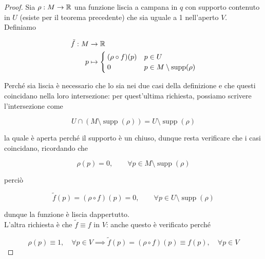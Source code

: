 \begin{proof}
	Sia $ \rho : M \to \mathbb{R} $ una funzione liscia a campana in $ q $ con supporto contenuto in $ U $ (esiste per il teorema precedente) che sia uguale a 1 nell'aperto $ V $.\\
	Definiamo
	
	\begin{align}
		\begin{split}
			\tilde{f} : M &\to \R\\
			p &\mapsto %
			\begin{cases}
				(\rho \circ f)(p) & p \in U\\
				0 & p \in M \setminus \operatorname{supp}(\rho)
			\end{cases}
		\end{split}
	\end{align}

	Perché sia liscia è necessario che lo sia nei due casi della definizione e che questi coincidano nella loro intersezione: per quest'ultima richiesta, possiamo scrivere l'intersezione come
	
	\begin{equation}
		U \cap (M \setminus \operatorname{supp}(\rho)) = U \setminus \operatorname{supp}(\rho)
	\end{equation}

	la quale è aperta perché il supporto è un chiuso, dunque resta verificare che i casi coincidano, ricordando che
	
	\begin{equation}
		\rho(p) = 0, \qquad \forall p \in M \setminus \operatorname{supp}(\rho)
	\end{equation}

	perciò
	
	\begin{equation}
		\tilde{f}(p) = (\rho \circ f)(p) = 0, \qquad \forall p \in U \setminus \operatorname{supp}(\rho)
	\end{equation}

	dunque la funzione è liscia dappertutto.\\
	L'altra richiesta è che $ \tilde{f} \equiv f $ in $ V $: anche questo è verificato perché
	
	\begin{equation}
		\rho(p) \equiv 1, \quad \forall p \in V \implies \tilde{f}(p) = (\rho \circ f)(p) \equiv f(p), \quad \forall p \in V
	\end{equation}
\end{proof}

